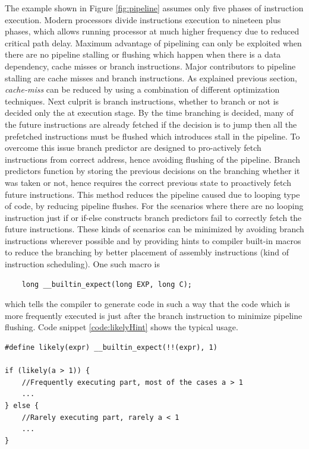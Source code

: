 The example shown in Figure \ref{fig:pipeline} assumes only five phases of instruction execution. Modern processors divide instructions execution to nineteen plus phases, which allows running processor at much higher frequency due to reduced critical path delay. Maximum advantage of pipelining can only be exploited when there are no pipeline stalling or flushing which happen when there is a data dependency, cache misses or branch instructions. Major contributors to pipeline stalling are cache misses and branch instructions. As explained previous section, \emph{cache-miss} can be reduced by using a combination of different optimization techniques. Next culprit is branch instructions, whether to branch or not is decided only the at execution stage. By the time branching is decided, many of the future instructions are already fetched if the decision is to jump then all the prefetched instructions must be flushed which introduces stall in the pipeline. To overcome this issue branch predictor are designed to pro-actively fetch instructions from correct address, hence avoiding flushing of the pipeline. Branch predictors function by storing the previous decisions on the branching whether it was taken or not, hence requires the correct previous state to proactively fetch future instructions. This method reduces the pipeline caused due to looping type of code, by reducing pipeline flushes. For the scenarios where there are no looping instruction just if or if-else constructs branch predictors fail to correctly fetch the future instructions. These kinds of scenarios can be minimized by avoiding branch instructions wherever possible and by providing hints to compiler built-in macros to reduce the branching by better placement of assembly instructions (kind of instruction scheduling). One such macro is 
\begin{verbatim}
	long __builtin_expect(long EXP, long C); 
\end{verbatim}
which tells the compiler to generate code in such a way that the code which is more frequently executed is just after the branch instruction to minimize pipeline flushing. Code snippet \ref{code:likelyHint} shows the typical usage.

\begin{code}
	\label{code:likelyHint}
\begin{verbatim}
#define likely(expr) __builtin_expect(!!(expr), 1)

if (likely(a > 1)) {
  	//Frequently executing part, most of the cases a > 1
	...
} else {
	//Rarely executing part, rarely a < 1
	...
}
\end{verbatim}
\end{code}

